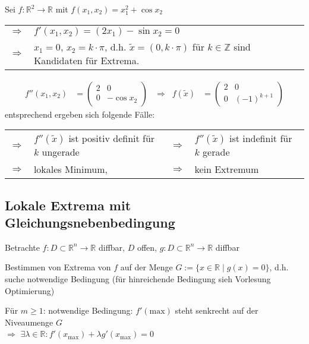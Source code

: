 \begin{example}
	Sei $f:\mathbb{R}^2\to\mathbb{R}$ mit $f(x_1, x_2) = x_1^2 + \cos x_2$ \\
	\begin{tabularx}{\linewidth}{r@{\ \ }X}
	$\Rightarrow$ & $f'(x_1, x_2) = (2x_1) - \sin x_2 = 0$ \\
	$\Rightarrow$  &$x_1 = 0$, $x_2 = k\cdot\pi$, d.h. $\tilde{x} = (0, k\cdot\pi)$ für $k\in\mathbb{Z}$ sind Kandidaten für Extrema.
	\end{tabularx} \begin{align*}
		f''(x_1, x_2) &= \begin{pmatrix}
			2 & 0 \\ 0 & -\cos x_2
		\end{pmatrix} & \Rightarrow\;\; f(\tilde{x}) &= \begin{pmatrix}
			2 & 0 \\ 0 & (-1)^{k+1}
		\end{pmatrix}
	\end{align*}
	entsprechend ergeben sich folgende Fälle:\\
	\begin{tabularx}{\linewidth}{r@{\ \ }Xr@{\ \ }X}
	$\Rightarrow$ & $f''(\tilde{x})$ ist positiv definit für $k$ ungerade & $\Rightarrow$ & $f''(\tilde{x})$ ist indefinit für $k$ gerade \\
	$\Rightarrow$ & lokales Minimum,&
	$\Rightarrow$ & kein Extremum
	\end{tabularx}
\end{example}

\subsection{Lokale Extrema mit Gleichungsnebenbedingung}
Betrachte $f:D\subset\mathbb{R}^n\to\mathbb{R}$ \gls{diffbar}, $D$ offen, $g:D\subset\mathbb{R}^n\to\mathbb{R}$ \gls{diffbar}

\begin{boldenvironment}[Frage:]
	Bestimmen von Extrema von $f$ auf der Menge $G:= \{ x\in\mathbb{R}\mid g(x) = 0 \}$, d.h. suche notwendige Bedingung (für hinreichende Bedingung sieh Vorlesung Optimierung)
\end{boldenvironment}

\begin{boldenvironment}[Motivation]
	Für $m\ge 1$: notwendige Bedingung: $f'(\mathrm{max})$ steht senkrecht auf der Niveaumenge $G$  \\
	$\Rightarrow$ $\exists\lambda\in\mathbb{R}: f'(x_{\max}) + \lambda g'(x_{\max}) = 0$
\end{boldenvironment}

